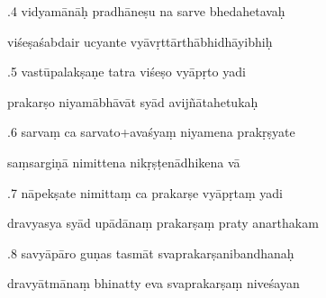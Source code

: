 \documentclass[article,12pt,a4paper]{memoir}%
\newcounter{parCount}
\begin{document}
	  
	  \pstart {}.4 vidyamānāḥ pradhāneṣu na sarve bhedahetavaḥ 
	{}
	\pend%
      

	  
	  \pstart \leavevmode%
	viśeṣaśabdair ucyante vyāvṛttārthābhidhāyibhiḥ 
	{}
	\pend%
      

	  
	  \pstart {}.5 vastūpalakṣaṇe tatra viśeṣo vyāpṛto yadi 
	{}
	\pend%
      

	  
	  \pstart \leavevmode%
	prakarṣo niyamābhāvāt syād avijñātahetukaḥ 
	{}
	\pend%
      

	  
	  \pstart {}.6 sarvaṃ ca sarvato+avaśyaṃ niyamena prakṛṣyate 
	{}
	\pend%
      

	  
	  \pstart \leavevmode%
	saṃsargiṇā nimittena nikṛṣṭenādhikena vā 
	{}
	\pend%
      

	  
	  \pstart {}.7 nāpekṣate nimittaṃ ca prakarṣe vyāpṛtaṃ yadi 
	{}
	\pend%
      

	  
	  \pstart \leavevmode%
	dravyasya syād upādānaṃ prakarṣaṃ praty anarthakam 
	{}
	\pend%
      

	  
	  \pstart {}.8 savyāpāro guṇas tasmāt svaprakarṣanibandhanaḥ 
	{}
	\pend%
      

	  
	  \pstart \leavevmode%
	dravyātmānaṃ bhinatty eva svaprakarṣaṃ niveśayan 
	{}
	\pend%
      
\end{document}
